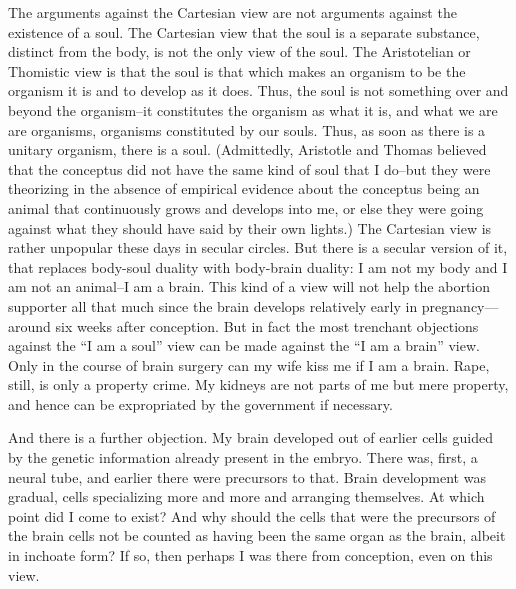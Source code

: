 The arguments against the Cartesian view are not arguments against 
the existence of a soul.  The Cartesian view that the soul is a separate 
substance, distinct from the body, is not the only view of the soul.  The 
Aristotelian or Thomistic view is that the soul is that which makes an 
organism to be the organism it is and to develop as it does.  Thus, the 
soul is not something over and beyond the organism–it constitutes the 
organism  as  what  it  is,  and  what  we  are  are  organisms,  organisms 
constituted by our souls.  Thus, as soon as there is a unitary organism, 
there  is  a  soul.    (Admittedly,  Aristotle  and  Thomas  believed  that  the 
conceptus  did  not  have  the same kind of soul that I do–but they were 
theorizing  in  the  absence  of  empirical  evidence  about  the  conceptus 
being an animal that continuously grows and develops into me, or else 
they were going against what they should have said by their own lights.)  
The Cartesian view is rather unpopular these days in secular circles. 
 But there is a secular version of it, that replaces body-soul duality with 
body-brain  duality:  I  am  not  my  body  and  I  am  not  an animal–I am a 
brain.  This kind of a view will not help the abortion supporter all that 
much since the brain develops relatively early in pregnancy—around six 
weeks after conception.  But in fact the most trenchant objections against 
the  “I  am  a  soul”  view  can  be  made  against  the  “I  am  a  brain”  view.  
Only in the course of brain surgery can my wife kiss me if I am a brain.  
Rape, still, is only a property crime.  My kidneys are not parts of me but 
mere  property,  and  hence  can  be  expropriated  by  the  government  if 
necessary. 

And there is a further objection.  My brain developed out of earlier 
cells guided by the genetic information already present in the embryo. 
There was, first, a neural tube, and earlier there were precursors to that.  
Brain development was gradual, cells specializing more and more and 
arranging themselves.  At which point did I come to exist?  And why 
should the cells that were the precursors of the brain cells not be counted 
as having been the same organ as the brain, albeit in inchoate form?  If 
so, then perhaps I was there from conception, even on this view. 

